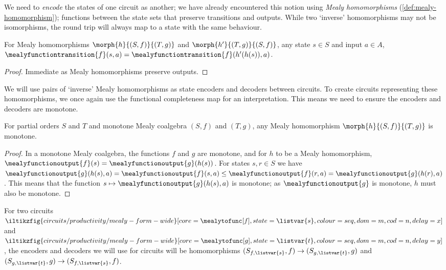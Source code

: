 We need to \emph{encode} the states of one circuit as another; we have already
encountered this notion using \emph{Mealy homomorphisms}
(\cref{def:mealy-homomorphism});
functions between the state sets that preserve transitions and outputs.
While two `inverse' homomorphisms may not be isomorphisms, the round
trip will always map to a state with the same behaviour.

\begin{lemma}
    For Mealy homomorphisms \(\morph{h}{(S,f)}{(T,g)}\) and
    \(\morph{h^\prime}{(T,g)}{(S,f)}\), any state \(s \in S\) and input
    \(a \in A\), \(
    \mealyfunctiontransition{f}(s, a)
    =
    \mealyfunctiontransition{f}(h^\prime(h(s)), a)
    \).
\end{lemma}
\begin{proof}
    Immediate as Mealy homomorphisms preserve outputs.
\end{proof}

We will use pairs of `inverse' Mealy homomorphisms as state encoders and
decoders between circuits.
To create circuits representing these homomorphisms, we once again use the
functional completeness map for an interpretation.
This means we need to ensure the encoders and decoders are monotone.

\begin{lemma}
    For partial orders \(S\) and \(T\) and monotone Mealy coalgebra
    \((S,f)\) and \((T,g)\), any Mealy homomorphism \(\morph{h}{(S,f)}{(T,g)}\)
    is monotone.
\end{lemma}
\begin{proof}
    In a monotone Mealy coalgebra, the functions \(f\) and \(g\) are monotone,
    and for \(h\) to be a Mealy homomorphism, \(
    \mealyfunctionoutput{f}(s)
    =
    \mealyfunctionoutput{g}(h(s))
    \).
    For states \(s,r \in S\) we have \(
    \mealyfunctionoutput{g}(h(s), a)
    =
    \mealyfunctionoutput{f}(s, a)
    \leq
    \mealyfunctionoutput{f}(r, a)
    =
    \mealyfunctionoutput{g}(h(r), a)
    \).
    This means that the function \(
    s \mapsto \mealyfunctionoutput{g}(h(s), a)
    \) is monotone; as \(\mealyfunctionoutput{g}\) is monotone, \(h\) must
    also be monotone.
\end{proof}

For two circuits \(
\iltikzfig{circuits/productivity/mealy-form-wide}[core=\mealytofunc[f],state=\listvar{s},colour=seq,dom=m,cod=n,delay=x]
\) and \(
\iltikzfig{circuits/productivity/mealy-form-wide}[core=\mealytofunc[g],state=\listvar{t},colour=seq,dom=m,cod=n,delay=y]
\), the encoders and decoders we will use for circuits will be homomorphisms
\((S_{f,\listvar{s}},f) \to (S_{g,\listvar{t}},g)\)
and
\((S_{g,\listvar{t}},g) \to (S_{f,\listvar{s}},f)\).



